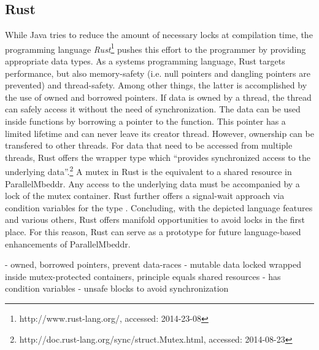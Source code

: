 \subsection{Rust}
While Java tries to reduce the amount of necessary locks at compilation time, the programming language \textit{Rust}\footnote{http://www.rust-lang.org/, accessed: 2014-23-08} pushes this effort to the programmer by providing appropriate data types. As a systems programming language, Rust targets performance, but also memory-safety (i.e. null pointers and dangling pointers are prevented) and thread-safety. Among other things, the latter is accomplished by the use of owned and borrowed pointers. If data is owned by a thread, the thread can safely access it without the need of synchronization. The data can be used inside functions by borrowing a pointer to the function. This pointer has a limited lifetime and can never leave its creator thread. However, ownership can be transfered to other threads. For data that need to be accessed from multiple threads, Rust offers the wrapper type  which ``provides synchronized access to the underlying data''.\footnote{http://doc.rust-lang.org/sync/struct.Mutex.html, accessed: 2014-08-23} A mutex in Rust is the equivalent to a shared resource in ParallelMbeddr. Any access to the underlying data must be accompanied by a lock of the mutex container. Rust further offers a signal-wait approach via condition variables for the type . Concluding, with the depicted language features and various others, Rust offers manifold opportunities to avoid locks in the first place. For this reason, Rust can serve as a prototype for future language-based enhancements of ParallelMbeddr.

- owned, borrowed pointers, prevent data-races
- mutable data locked wrapped inside mutex-protected containers, principle equals shared resources
- has condition variables
- unsafe blocks to avoid synchronization

